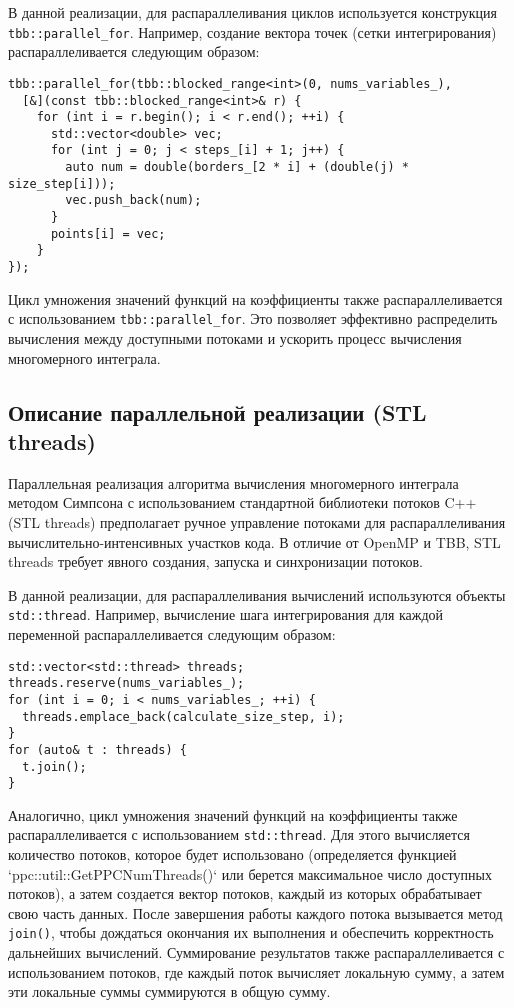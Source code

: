 \documentclass[12pt]{article}
\begin{document}
В данной реализации, для распараллеливания циклов используется конструкция \texttt{tbb::parallel\_for}. Например, создание вектора точек (сетки интегрирования) распараллеливается следующим образом:

\begin{verbatim}
tbb::parallel_for(tbb::blocked_range<int>(0, nums_variables_),
  [&](const tbb::blocked_range<int>& r) {
    for (int i = r.begin(); i < r.end(); ++i) {
      std::vector<double> vec;
      for (int j = 0; j < steps_[i] + 1; j++) {
        auto num = double(borders_[2 * i] + (double(j) * size_step[i]));
        vec.push_back(num);
      }
      points[i] = vec;
    }
});
\end{verbatim}

Цикл умножения значений функций на коэффициенты также распараллеливается с использованием \texttt{tbb::parallel\_for}. Это позволяет эффективно распределить вычисления между доступными потоками и ускорить процесс вычисления многомерного интеграла.


\subsection{Описание параллельной реализации (STL threads)}

\hspace*{1.35em}Параллельная реализация алгоритма вычисления многомерного интеграла методом Симпсона с использованием стандартной библиотеки потоков C++ (STL threads) предполагает ручное управление потоками для распараллеливания вычислительно-интенсивных участков кода. В отличие от OpenMP и TBB, STL threads требует явного создания, запуска и синхронизации потоков.

В данной реализации, для распараллеливания вычислений используются объекты \texttt{std::thread}. Например, вычисление шага интегрирования для каждой переменной распараллеливается следующим образом:

\begin{verbatim}
std::vector<std::thread> threads;
threads.reserve(nums_variables_);
for (int i = 0; i < nums_variables_; ++i) {
  threads.emplace_back(calculate_size_step, i);
}
for (auto& t : threads) {
  t.join();
}
\end{verbatim}

Аналогично, цикл умножения значений функций на коэффициенты также распараллеливается с использованием \texttt{std::thread}. Для этого вычисляется количество потоков, которое будет использовано (определяется функцией `ppc::util::GetPPCNumThreads()` или берется максимальное число доступных потоков), а затем создается вектор потоков, каждый из которых обрабатывает свою часть данных. После завершения работы каждого потока вызывается метод \texttt{join()}, чтобы дождаться окончания их выполнения и обеспечить корректность дальнейших вычислений.  Суммирование результатов также распараллеливается с использованием потоков, где каждый поток вычисляет локальную сумму, а затем эти локальные суммы суммируются в общую сумму.
\end{document}
